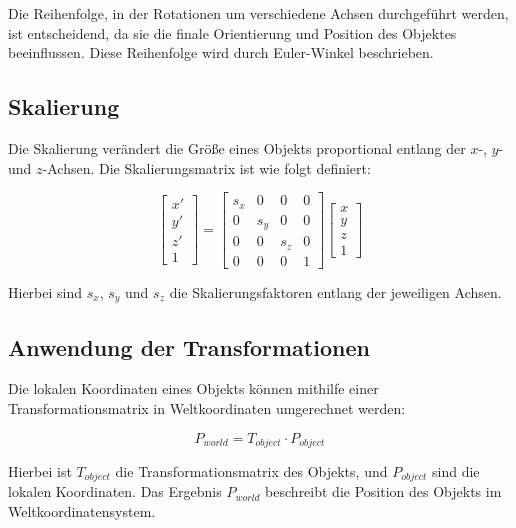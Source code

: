 Die Reihenfolge, in der Rotationen um verschiedene Achsen durchgeführt werden, ist entscheidend, da sie die finale Orientierung und Position des Objektes beeinflussen. Diese Reihenfolge wird durch Euler-Winkel beschrieben.

\subsection{Skalierung}

Die Skalierung verändert die Größe eines Objekts proportional entlang der \(x\)-, \(y\)- und \(z\)-Achsen. Die Skalierungsmatrix ist wie folgt definiert:

\begin{equation}
\begin{bmatrix}
x' \\ y' \\ z' \\ 1
\end{bmatrix}
=
\begin{bmatrix}
s_x & 0 & 0 & 0 \\
0 & s_y & 0 & 0 \\
0 & 0 & s_z & 0 \\
0 & 0 & 0 & 1
\end{bmatrix}
\begin{bmatrix}
x \\ y \\ z \\ 1
\end{bmatrix}
\end{equation}

Hierbei sind \(s_x\), \(s_y\) und \(s_z\) die Skalierungsfaktoren entlang der jeweiligen Achsen.

\subsection{Anwendung der Transformationen}

Die lokalen Koordinaten eines Objekts können mithilfe einer Transformationsmatrix in Weltkoordinaten umgerechnet werden:

\begin{equation}
P_{world} = T_{object} \cdot P_{object}
\end{equation}

Hierbei ist \(T_{object}\) die Transformationsmatrix des Objekts, und \(P_{object}\) sind die lokalen Koordinaten. Das Ergebnis \(P_{world}\) beschreibt die Position des Objekts im Weltkoordinatensystem.

